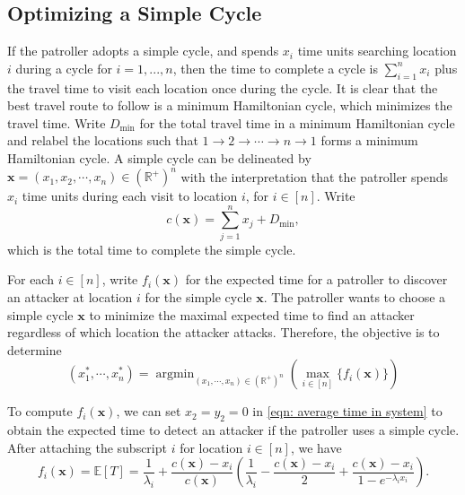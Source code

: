 \documentclass[11pt,a4paper]{article}
\DeclareMathOperator*{\argmin}{argmin}
\begin{document}



\subsection{Optimizing a Simple Cycle} \label{sec: optimizing a simple cycle}
If the patroller adopts a simple cycle, and spends $x_i$ time units searching location $i$ during a cycle for $i=1,...,n$, then the time to complete a cycle is $\sum_{i=1}^n x_i$ plus the travel time to visit each location once during the cycle.
It is clear that the best travel route to follow is a minimum Hamiltonian cycle, which minimizes the travel time.
Write $D_{\min}$ for the total travel time in a minimum Hamiltonian cycle and relabel the locations such that $1 \rightarrow 2 \rightarrow \cdots \rightarrow n \rightarrow 1$ forms a minimum Hamiltonian cycle. 
A simple cycle can be delineated by $\textbf{x} = (x_1,x_2,\cdots,x_n) \in (\mathbb{R}^+)^n$ with the interpretation that the patroller spends $x_i$ time units during each visit to location $i$, for $i \in [n]$.
Write 
$$ 
c(\textbf{x}) = \sum_{j=1}^n x_j + D_{\min},
$$
which is the total time to complete the simple cycle.


For each $i \in [n]$, write $f_i(\textbf{x})$ for the expected time for a patroller to discover an attacker at location $i$ for the simple cycle $\textbf{x}$.
The patroller wants to choose a simple cycle $\textbf{x}$ to minimize the maximal expected time to find an attacker regardless of which location the attacker attacks.
Therefore, the objective is to determine
\begin{equation} \label{eqn: heterogeneous argmin}
    (x_1^*,\cdots,x_n^*) = \argmin_{(x_1,\cdots,x_n) \in (\mathbb{R}^+)^n} \left( \max_{i \in [n]} \{ f_i(\textbf{x}) \} \right)
\end{equation}

To compute $f_i(\textbf{x})$, we can set $x_2=y_2=0$ in \eqref{eqn: average time in system} to obtain the expected time to detect an attacker if the patroller uses a simple cycle.
After attaching the subscript $i$ for location $i \in [n]$, we have
\begin{equation} \label{simple cycle formula}
    f_i(\textbf{x}) = \mathbb{E}[T] =  \frac{1}{\lambda_i} + \frac{c(\textbf{x})-x_i}{c(\textbf{x})} \left( \frac{1}{\lambda_i} - \frac{c(\textbf{x})-x_i}{2} + \frac{c(\textbf{x})-x_i}{1-e^{-\lambda_i x_i}} \right).
\end{equation}
\end{document}
